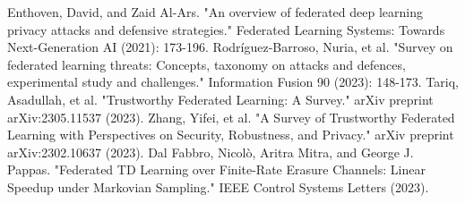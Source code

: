 \documentclass[conference]{IEEEtran}
\begin{document}
\begin{thebibliography}{00}
     Enthoven, David, and Zaid Al-Ars. "An overview of federated deep learning privacy attacks and defensive strategies." Federated Learning Systems: Towards Next-Generation AI (2021): 173-196.  
     Rodríguez-Barroso, Nuria, et al. "Survey on federated learning threats: Concepts, taxonomy on attacks and defences, experimental study and challenges." Information Fusion 90 (2023): 148-173.  
     Tariq, Asadullah, et al. "Trustworthy Federated Learning: A Survey." arXiv preprint arXiv:2305.11537 (2023).   
     Zhang, Yifei, et al. "A Survey of Trustworthy Federated Learning with Perspectives on Security, Robustness, and Privacy." arXiv preprint arXiv:2302.10637 (2023).  
     Dal Fabbro, Nicolò, Aritra Mitra, and George J. Pappas. "Federated TD Learning over Finite-Rate Erasure Channels: Linear Speedup under Markovian Sampling." IEEE Control Systems Letters (2023).  










\end{thebibliography}
\end{document}
